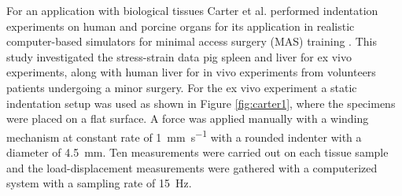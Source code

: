 For an application with biological tissues Carter et al. performed indentation experiments on 
human and porcine organs for its application in realistic computer-based simulators 
for minimal access surgery (MAS) training \cite{Carter2001}. 
This study investigated the stress-strain data pig spleen and liver for ex vivo experiments, 
along with human liver for in vivo experiments from volunteers patients undergoing a minor 
surgery. For the ex vivo experiment a static indentation setup was used as shown in Figure 
\ref{fig:carter1}, where the specimens were placed on a flat surface. A force was applied 
manually with a winding mechanism at constant rate of \SI[per-mode = symbol]{1}{\milli \m\per \second} 
with a rounded indenter with a diameter of \SI{4.5}{\milli \m}. Ten measurements were 
carried out on each tissue sample and the load-displacement measurements were 
gathered with a computerized system with a sampling rate of \SI{15}{\hertz}.\\

